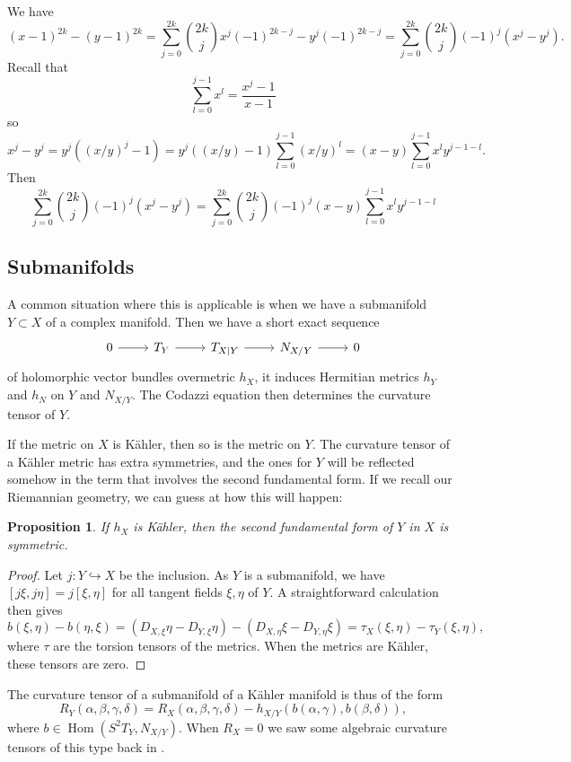 \documentclass[10pt,a4paper]{article}
\newtheorem{prop}[theo]{Proposition}
\newtheorem*{proof}{Proof}
\DeclareMathOperator{\Hom}{Hom}
\begin{document}
We have
\[
(x-1)^{2k} - (y-1)^{2k}
= \sum_{j=0}^{2k}\binom{2k}{j} x^j (-1)^{2k-j} - y^j (-1)^{2k-j}
= \sum_{j=0}^{2k}\binom{2k}{j} (-1)^{j}(x^j - y^j).
\]
Recall that
\[
\sum_{l=0}^{j-1} x^l = \frac{x^j-1}{x-1}
\]
so
\[
x^j-y^j
= y^j((x/y)^j - 1)
= y^j ((x/y)-1) \sum_{l=0}^{j-1} (x/y)^l
= (x - y) \sum_{l=0}^{j-1} x^l y^{j-1-l}.
\]
Then
\[
\sum_{j=0}^{2k}\binom{2k}{j} (-1)^{j}(x^j - y^j)
= \sum_{j=0}^{2k}\binom{2k}{j} (-1)^{j} (x - y) \sum_{l=0}^{j-1} x^l y^{j-1-l}
\]



\subsection{Submanifolds}

A common situation where this is applicable is when we have a submanifold $Y \subset X$ of a complex manifold. Then we have a short exact sequence
\[
\begin{tikzcd}
0 \arrow[r] & T_Y \arrow[r] & T_{X|Y} \arrow[r] & N_{X/Y} \arrow[r] & 0
\end{tikzcd}
\]
of holomorphic vector bundles overmetric $h_X$, it induces Hermitian metrics $h_Y$ and $h_{N}$ on $Y$ and $N_{X/Y}$. The Codazzi equation then determines the curvature tensor of $Y$.


If the metric on $X$ is K\"ahler, then so is the metric on $Y$. The curvature tensor of a K\"ahler metric has extra symmetries, and the ones for $Y$ will be reflected somehow in the term that involves the second fundamental form. If we recall our Riemannian geometry, we can guess at how this will happen:

\begin{prop}
If $h_X$ is K\"ahler, then the second fundamental form of $Y$ in $X$ is symmetric.
\end{prop}

\begin{proof}
Let $j : Y \hookrightarrow X$ be the inclusion. As $Y$ is a submanifold, we have $[j\xi,j\eta] = j[\xi,\eta]$ for all tangent fields $\xi,\eta$ of $Y$. A straightforward calculation then gives
\[
b(\xi,\eta) - b(\eta,\xi)
= (D_{X,\xi}\eta - D_{Y,\xi}\eta)
- (D_{X,\eta}\xi - D_{Y,\eta}\xi)
= \tau_X(\xi,\eta) - \tau_Y(\xi,\eta),
\]
where $\tau$ are the torsion tensors of the metrics. When the metrics are K\"ahler, these tensors are zero.
\end{proof}

The curvature tensor of a submanifold of a K\"ahler manifold is thus of the form
\[
R_Y(\alpha,\beta,\gamma,\delta)
= R_X(\alpha,\beta,\gamma,\delta)
- h_{X/Y}(b(\alpha,\gamma), b(\beta,\delta)),
\]
where $b \in \Hom(S^2 T_Y, N_{X/Y})$. When $R_X = 0$ we saw some algebraic curvature tensors of this type back in .
\end{document}
